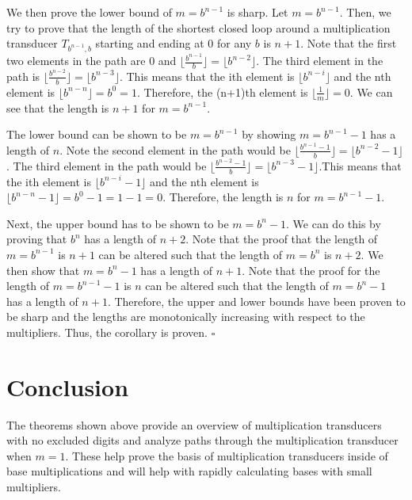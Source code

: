 \documentclass{article}
\begin{document}
We then prove the lower bound of $m = b^{n-1}$ is sharp. Let $m = b^{n-1}$. Then, we try to prove that the length of the shortest closed loop around a multiplication transducer $T_{b^{n-1}, b}$ starting and ending at $0$ for any $b$ is $n + 1$. Note that the first two elements in the path are $0$ and $\lfloor{\frac{b^{n-1}}{b}}\rfloor = \lfloor{b^{n-2}}\rfloor$. The third element in the path is $\lfloor{\frac{b^{n-2}}{b}}\rfloor = \lfloor{b^{n-3}}\rfloor$. This means that the ith element is $\lfloor{b^{n-i}}\rfloor$ and the nth element is $\lfloor{b^{n-n}}\rfloor = b^0 = 1$. Therefore, the (n+1)th element is $\lfloor{\frac{1}{m}}\rfloor = 0$. We can see that the length is $n + 1$ for $m = b^{n-1}$.  \vspace{\baselineskip}

\noindent
The lower bound can be shown to be $m = b^{n-1}$ by showing $m = b^{n-1} - 1$ has a length of $n$. Note the second element in the path would be $\lfloor{\frac{b^{n-1} - 1}{b}}\rfloor = \lfloor{b^{n-2} - 1 }\rfloor$. The third element in the path would be $\lfloor{\frac{b^{n-2} - 1}{b}}\rfloor = \lfloor{b^{n-3} - 1}\rfloor$.This means that the ith element is $\lfloor{b^{n-i}-1}\rfloor$ and the nth element is $\lfloor{b^{n-n}-1}\rfloor = b^0 - 1 = 1-1 = 0$. Therefore, the length is $n$ for $m = b^{n-1} - 1$. \vspace{\baselineskip}

\noindent
Next, the upper bound has to be shown to be $m = b^n -1$. We can do this by proving that $b^n$ has a length of $n + 2$. Note that the proof that the length of $m = b^{n-1}$ is $n + 1$ can be altered such that the length of $m = b^n$ is $n + 2$. We then show that $m = b^n-1$ has a length of $n + 1$. Note that the proof for the length of $m = b^{n-1} - 1$ is $n$ can be altered such that the length of $m = b^n -1$ has a length of $n + 1$. Therefore, the upper and lower bounds have been proven to be sharp and the lengths are monotonically increasing with respect to the multipliers. Thus, the corollary is proven. $\square$ \vspace{\baselineskip}

\section{Conclusion}

\hspace*{5mm} The theorems shown above provide an overview of multiplication transducers with no excluded digits and analyze paths through the multiplication transducer when $m = 1$. These help prove the basis of multiplication transducers inside of base multiplications and will help with rapidly calculating bases with small multipliers. \vspace{\baselineskip}
\end{document}
